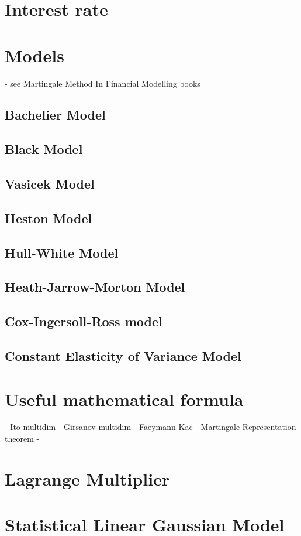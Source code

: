 \documentclass[a4paper,10pt]{article}
\begin{document}
\section{Interest rate}
\section{Models}
- see Martingale Method In Financial Modelling books
\subsection{Bachelier Model}
\subsection{Black Model}
\subsection{Vasicek Model}
\subsection{Heston Model}
\subsection{Hull-White Model}
\subsection{Heath-Jarrow-Morton Model}
\subsection{Cox-Ingersoll-Ross model}
\subsection{Constant Elasticity of Variance Model}
\section{Useful mathematical formula}
- Ito multidim
- Girsanov multidim
- Faeymann Kac
- Martingale Representation theorem
- 
\section{Lagrange Multiplier}
\section{Statistical Linear Gaussian Model}


\end{document}
